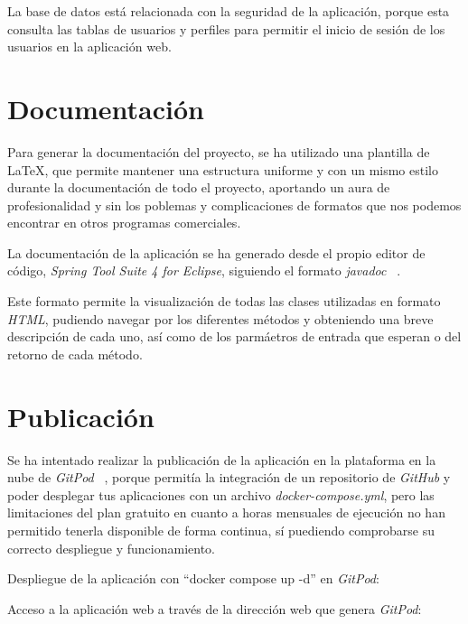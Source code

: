 La base de datos está relacionada con la seguridad de la aplicación, porque esta consulta las tablas de usuarios y perfiles para permitir el inicio de sesión de los usuarios en la aplicación web.

\section{Documentación}

Para generar la documentación del proyecto, se ha utilizado una plantilla de \LaTeX, que permite mantener una estructura uniforme y con un mismo estilo durante la documentación de todo el proyecto, aportando un aura de profesionalidad y sin los poblemas y complicaciones de formatos que nos podemos encontrar en otros programas comerciales.

La documentación de la aplicación se ha generado desde el propio editor de código, \textit{Spring Tool Suite 4 for Eclipse}, siguiendo el formato \textit{javadoc} ~\cite{doc:javadoc}.

Este formato permite la visualización de todas las clases utilizadas en formato \textit{HTML}, pudiendo navegar por los diferentes métodos y obteniendo una breve descripción de cada uno, así como de los parmáetros de entrada que esperan o del retorno de cada método.
\clearpage
\section{Publicación}

Se ha intentado realizar la publicación de la aplicación en la plataforma en la nube de \textit{GitPod} ~\cite{doc:gitpod}, porque permitía la integración de un repositorio de \textit{GitHub} y poder desplegar tus aplicaciones con un archivo \textit{docker-compose.yml}, pero las limitaciones del plan gratuito en cuanto a horas mensuales de ejecución no han permitido tenerla disponible de forma continua, sí puediendo comprobarse su correcto despliegue y funcionamiento.

Despliegue de la aplicación con ``docker compose up -d'' en \textit{GitPod}:

Acceso a la aplicación web a través de la dirección web que genera \textit{GitPod}:




